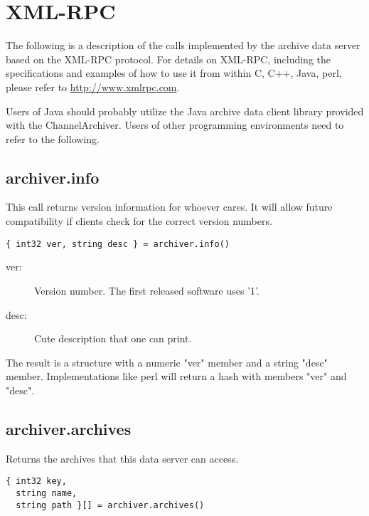 \section{XML-RPC}
The following is a description of the calls implemented by the archive
data server based on the XML-RPC protocol.
For details on XML-RPC, including the specifications and examples of
how to use it from within C, C++, Java, perl, please refer to
\href{http://www.xmlrpc.com}{http://www.xmlrpc.com}.

Users of Java should probably utilize the Java archive data client
library provided with the ChannelArchiver. Users of other programming
environments need to refer to the following.

\subsection{archiver.info} %
This call returns version information for 
whoever cares. It will allow future compatibility
if clients check for the correct version numbers.

\begin{lstlisting}[keywordstyle=\sffamily]
{ int32 ver, string desc } = archiver.info()
\end{lstlisting}

\begin{description}
\item[\sffamily ver:]  Version number. The first released software uses '1'.
\item[\sffamily desc:] Cute description that one can print.
\end{description}

\noindent The result is a structure with a numeric "ver"
member and a string "desc" member. Implementations
like perl will return a hash with members "ver"
and "desc".

\subsection{archiver.archives} %
Returns the archives that this data server can access.

\begin{lstlisting}[keywordstyle=\sffamily]
{ int32 key,
  string name,
  string path }[] = archiver.archives()
\end{lstlisting}


